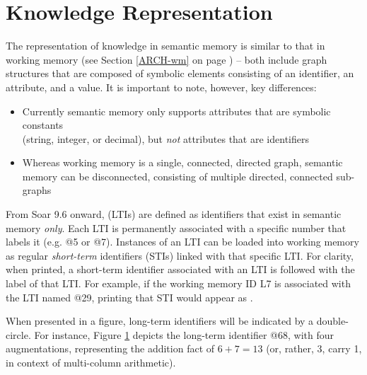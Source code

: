 \section{Knowledge Representation}
\label{SMEM-kr}

The representation of knowledge in semantic memory is similar to that in working memory (see Section \ref{ARCH-wm} on page \pageref{ARCH-wm}) -- both include graph structures that are composed of symbolic elements consisting of an identifier, an attribute, and a value.
It is important to note, however, key differences:

\begin{itemize}

\item
Currently semantic memory only supports attributes that are symbolic constants \\
(string, integer, or decimal), but \emph{not} attributes that are identifiers

\item
Whereas working memory is a single, connected, directed graph, semantic memory can be disconnected, consisting of multiple directed, connected sub-graphs

\end{itemize}

From Soar 9.6 onward,   (LTIs) are defined as identifiers that exist in semantic memory \emph{only}.
Each LTI is permanently associated with a specific number that labels it (e.g. {@}5 or {@}7).
Instances of an LTI can be loaded into working memory as regular \emph{short-term} identifiers (STIs) linked with that specific LTI.
For clarity, when printed, a short-term identifier associated with an LTI is followed with the label of that LTI.
For example, if the working memory ID L7 is associated with the LTI named {@}29, printing that STI would appear as .

When presented in a figure, long-term identifiers will be indicated by a double-circle.
For instance, Figure \ref{fig:smem-concept} depicts the long-term identifier {@}68, with four augmentations, representing the addition fact of ${6+7=13}$ (or, rather, 3, carry 1, in context of multi-column arithmetic).

\begin{figure}
\label{fig:smem-concept}
\end{figure}

